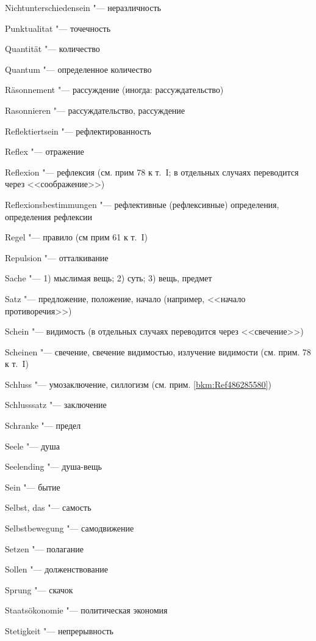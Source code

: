 {{\begin{multicols}{2}
Nichtunterschiedensein "--- неразличность

\bigskip

Punktualitat "--- точечность

\bigskip

Quantität "--- количество

Quantum "--- определенное количество

\bigskip

Räsonnement "--- рассуждение (иногда: рассуждательство)

Rasonnieren "--- рассуждательство, рассуждение

Reflektiertsein "--- рефлектированность

Reflex "--- отражение

Reflexion "--- рефлексия (см. прим 78 к т.~I; в отдельных случаях
переводится через <<соображение>>)

Reflexionsbestimmungen "--- рефлективные (рефлексивные)
определения, определения рефлексии

Regel "--- правило (см прим 61 к т.~I)

Repulsion "--- отталкивание

\bigskip

Sache "--- 1) мыслимая вещь; 2) суть; 3) вещь, предмет

Satz "--- предложение, положение, начало (например, <<начало противоречия>>)

Schein "--- видимость (в отдельных случаях переводится через <<свечение>>)

Scheinen "--- свечение, свечение видимостью, излучение видимости
(см. прим. 78 к т.~I)

Schluss "--- умозаключение, силлогизм (см. прим. \ref{bkm:Ref486285580})

Schlusssatz "--- заключение

Schranke "--- предел

Seele "--- душа

Seelending "--- душа-вещь

Sein "--- бытие

Selbst, das "--- самость

Selbstbewegung "--- самодвижение

Setzen "--- полагание

Sollen "--- долженствование

Sprung "--- скачок

Staatsökonomie "--- политическая экономия

Stetigkeit "--- непрерывность


\end{multicols}}}
